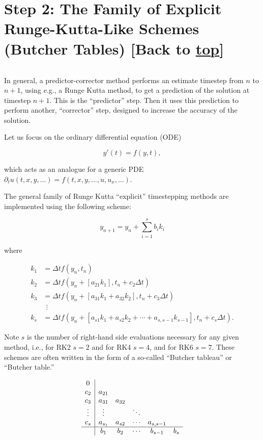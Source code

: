 \documentclass[landscape,letterpaper,10pt,english]{article}
\begin{document}
    \hypertarget{step-2-the-family-of-explicit-runge-kutta-like-schemes-butcher-tables-back-to-top}{%
\section{\texorpdfstring{Step 2: The Family of Explicit Runge-Kutta-Like
Schemes (Butcher Tables) {[}Back to
\hyperref[toc]{top}{]}}{Step 2: The Family of Explicit Runge-Kutta-Like Schemes (Butcher Tables) {[}Back to {]}}}\label{step-2-the-family-of-explicit-runge-kutta-like-schemes-butcher-tables-back-to-top}}

\[\label{introbutcher}\]

In general, a predictor-corrector method performs an estimate timestep
from \(n\) to \(n+1\), using e.g., a Runge Kutta method, to get a
prediction of the solution at timestep \(n+1\). This is the
``predictor'' step. Then it uses this prediction to perform another,
``corrector'' step, designed to increase the accuracy of the solution.

Let us focus on the ordinary differential equation (ODE)

\[ y'(t) = f(y,t), \]

which acts as an analogue for a generic PDE
\(\partial_{t}u(t,x,y,...)=f(t,x,y,...,u,u_x,...)\).

The general family of Runge Kutta ``explicit'' timestepping methods are
implemented using the following scheme:

\[y_{n+1} = y_n + \sum_{i=1}^s b_ik_i \]

where

\begin{align}
k_1 &= \Delta tf(y_n, t_n) \\
k_2 &= \Delta tf(y_n + [a_{21}k_1], t_n + c_2\Delta t) \\
k_3 &= \Delta tf(y_n +[a_{31}k_1 + a_{32}k_2], t_n + c_3\Delta t) \\
& \ \ \vdots \\
k_s &= \Delta tf(y_n +[a_{s1}k_1 + a_{s2}k_2 + \cdots + a_{s, s-1}k_{s-1}], t_n + c_s\Delta t).
\end{align}

Note \(s\) is the number of right-hand side evaluations necessary for
any given method, i.e., for RK2 \(s=2\) and for RK4 \(s=4\), and for RK6
\(s=7\). These schemes are often written in the form of a so-called
``Butcher tableau'' or ``Butcher table.''

\[\begin{array}{c|ccccc}
    0 & \\
    c_2 & a_{21} & \\
    c_3 & a_{31} & a_{32} & \\
    \vdots & \vdots &  & \ddots \\
    c_s & a_{s_1} & a_{s2} & \cdots & a_{s,s-1} \\ \hline 
     & b_1 & b_2 & \cdots & b_{s-1} & b_s
\end{array} \]
\end{document}
